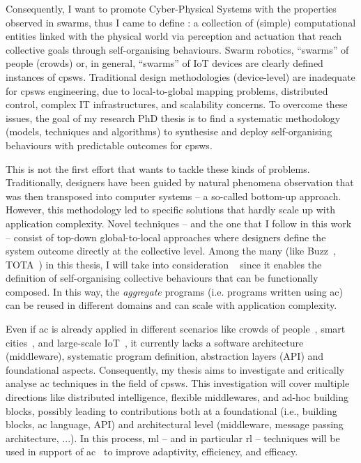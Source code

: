 \documentclass[11pt]{article}
\begin{document}
Consequently, I want to promote Cyber-Physical Systems with the properties observed in swarms, thus I came to define : a collection of (simple) computational entities linked with the physical world via perception and actuation that reach collective goals through self-organising behaviours.
%
Swarm robotics, ``swarms” of people (crowds) or, in general, ``swarms” of IoT devices are clearly defined instances of \acp{cpsw}.
%
Traditional design methodologies (device-level) are inadequate for \acp{cpsw} engineering, due to local-to-global mapping problems, distributed control, complex IT infrastructures, and scalability concerns.
%
To overcome these issues, the goal of my research PhD thesis is to find a systematic methodology (models, techniques and algorithms) to synthesise and deploy self-organising behaviours with predictable outcomes for \acp{cpsw}.

This is not the first effort that wants to tackle these kinds of problems. 
%
Traditionally, designers have been guided by natural phenomena observation that was then transposed into computer systems -- a so-called bottom-up approach. 
%
However, this methodology led to specific solutions that hardly scale up with application complexity.
%
Novel techniques -- and the one that I follow in this work -- consist of top-down global-to-local approaches where designers define the system outcome directly at the collective level.
%
Among the many (like Buzz~\cite{DBLP:journals/software/PinciroliB16}, TOTA~\cite{DBLP:conf/icdcsw/MameiZL03}) in this thesis, I will take into consideration ~\cite{DBLP:journals/computer/BealPV15} since it enables the definition of self-organising collective behaviours that can be functionally composed. 
%
In this way, the \textit{aggregate} programs (i.e. programs written using \ac{ac}) can be reused in different domains and can scale with application complexity. 

Even if \ac{ac} is already applied in different scenarios like crowds of people~\cite{DBLP:journals/computer/BealPV15}, smart cities~\cite{DBLP:journals/isci/CasadeiFPRSV19}, and large-scale IoT~\cite{DBLP:journals/fgcs/CasadeiFPRSV19}, it currently lacks a software architecture (middleware), systematic program definition, abstraction layers (API) and foundational aspects.
%
Consequently, my thesis aims to investigate and critically analyse \ac{ac} techniques in the field of \acp{cpsw}.
%
This investigation will cover multiple directions like distributed intelligence, flexible middlewares, and ad-hoc building blocks, possibly leading to contributions both at a foundational (i.e., building blocks, \ac{ac} language, API) and architectural level (middleware, message passing architecture, ...).
%
In this process, \ac{ml} -- and in particular \ac{rl} -- techniques will be used in support of \ac{ac}~\cite{research} to improve adaptivity, efficiency, and efficacy.
\end{document}
